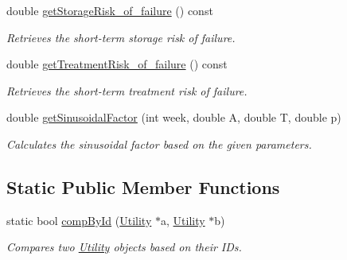\begin{DoxyCompactItemize}
double \mbox{\hyperlink{classUtility_aaaa05e97f2d33cf7a28b5c91ec253026}{get\+Storage\+Risk\+\_\+of\+\_\+failure}} () const
\begin{DoxyCompactList}\small\item\em Retrieves the short-\/term storage risk of failure. \end{DoxyCompactList}\item 
double \mbox{\hyperlink{classUtility_a1fd8aedeaf56d674fd024dac1f11b20c}{get\+Treatment\+Risk\+\_\+of\+\_\+failure}} () const
\begin{DoxyCompactList}\small\item\em Retrieves the short-\/term treatment risk of failure. \end{DoxyCompactList}\item 
double \mbox{\hyperlink{classUtility_affbfd106c7b5cdf6703d01d6ad838fde}{get\+Sinusoidal\+Factor}} (int week, double A, double T, double p)
\begin{DoxyCompactList}\small\item\em Calculates the sinusoidal factor based on the given parameters. \end{DoxyCompactList}\end{DoxyCompactItemize}
\subsection*{Static Public Member Functions}
\begin{DoxyCompactItemize}
\item 
static bool \mbox{\hyperlink{classUtility_a360c97e7dd372f3ff57f94314743e53d}{comp\+By\+Id}} (\mbox{\hyperlink{classUtility}{Utility}} $\ast$a, \mbox{\hyperlink{classUtility}{Utility}} $\ast$b)
\begin{DoxyCompactList}\small\item\em Compares two \mbox{\hyperlink{classUtility}{Utility}} objects based on their I\+Ds. \end{DoxyCompactList}\end{DoxyCompactItemize}
